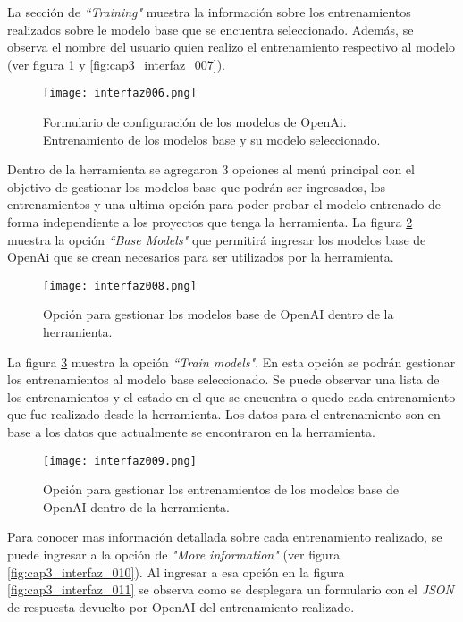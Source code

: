 La sección de \textit{``Training"} muestra la información sobre los entrenamientos realizados sobre le modelo base que se encuentra seleccionado. Además, se observa el nombre del usuario quien realizo el entrenamiento respectivo al modelo (ver figura \ref{fig:cap3_interfaz_006} y \ref{fig:cap3_interfaz_007}).

\begin{figure}[H]  
 	\centering
 	\texttt{[image: interfaz006.png]} 
 	\caption{Formulario de configuración de los modelos de OpenAi. Entrenamiento de los modelos base y su modelo seleccionado.}
 	\label{fig:cap3_interfaz_006}
\end{figure}

Dentro de la herramienta se agregaron 3 opciones al menú principal con el objetivo de gestionar los modelos base que podrán ser ingresados, los entrenamientos y una ultima opción para poder probar el modelo entrenado de forma independiente a los proyectos que tenga la herramienta. La figura \ref{fig:cap3_interfaz_008} muestra la opción \textit{``Base Models"} que permitirá ingresar los modelos base de OpenAi que se crean necesarios para ser utilizados por la herramienta.

\begin{figure}[H]  
	\centering
	\texttt{[image: interfaz008.png]} 
	\caption{Opción para gestionar los modelos base de OpenAI dentro de la herramienta.}
	\label{fig:cap3_interfaz_008}
\end{figure}

La figura \ref{fig:cap3_interfaz_009} muestra la opción \textit{``Train models"}. En esta opción se podrán gestionar los entrenamientos al modelo base seleccionado. Se puede observar una lista de los entrenamientos y el estado en el que se encuentra o quedo cada entrenamiento que fue realizado desde la herramienta. Los datos para el entrenamiento son en base a los datos que actualmente se encontraron en la herramienta.  

\begin{figure}[H]  
	\centering
	\texttt{[image: interfaz009.png]} 
	\caption{Opción para gestionar los entrenamientos de los modelos base de OpenAI dentro de la herramienta.}
	\label{fig:cap3_interfaz_009}
\end{figure} 

Para conocer mas información detallada sobre cada entrenamiento realizado, se puede ingresar a la opción de \textit{"More information"} (ver figura \ref{fig:cap3_interfaz_010}). Al ingresar a esa opción en la figura \ref{fig:cap3_interfaz_011} se observa  como se desplegara un formulario con el \textit{JSON} de respuesta devuelto por OpenAI del entrenamiento realizado. 

